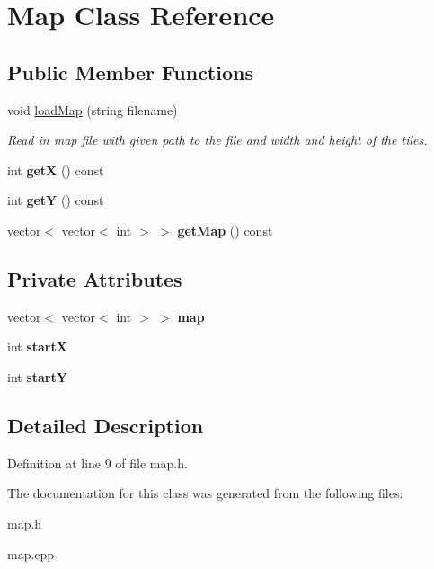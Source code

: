 \hypertarget{classMap}{}\section{Map Class Reference}
\label{classMap}
\subsection*{Public Member Functions}
\begin{DoxyCompactItemize}
\item 
void \hyperlink{classMap_a51e1c9c777bc6c4171707f1528a73dc6}{load\+Map} (string filename)\hypertarget{classMap_a51e1c9c777bc6c4171707f1528a73dc6}{}\label{classMap_a51e1c9c777bc6c4171707f1528a73dc6}

\begin{DoxyCompactList}\small\item\em Read in map file with given path to the file and width and height of the tiles. \end{DoxyCompactList}\item 
int {\bfseries getX} () const \hypertarget{classMap_ae235f91105c54961e42e2750cf52deaa}{}\label{classMap_ae235f91105c54961e42e2750cf52deaa}

\item 
int {\bfseries getY} () const \hypertarget{classMap_a7d9858d941f8e40226f4a12d4f8437c4}{}\label{classMap_a7d9858d941f8e40226f4a12d4f8437c4}

\item 
vector$<$ vector$<$ int $>$ $>$ {\bfseries get\+Map} () const \hypertarget{classMap_a84b44f93dc09fc770710b84bf070adfe}{}\label{classMap_a84b44f93dc09fc770710b84bf070adfe}

\end{DoxyCompactItemize}
\subsection*{Private Attributes}
\begin{DoxyCompactItemize}
\item 
vector$<$ vector$<$ int $>$ $>$ {\bfseries map}\hypertarget{classMap_aa955577fd21886c36625b2c694a21b08}{}\label{classMap_aa955577fd21886c36625b2c694a21b08}

\item 
int {\bfseries startX}\hypertarget{classMap_aec09a812761311faef72bd6aae7eb586}{}\label{classMap_aec09a812761311faef72bd6aae7eb586}

\item 
int {\bfseries startY}\hypertarget{classMap_a0d8a9a37385dbb4c831b61f72af82081}{}\label{classMap_a0d8a9a37385dbb4c831b61f72af82081}

\end{DoxyCompactItemize}


\subsection{Detailed Description}


Definition at line 9 of file map.\+h.



The documentation for this class was generated from the following files\+:\begin{DoxyCompactItemize}
\item 
map.\+h\item 
map.\+cpp\end{DoxyCompactItemize}
